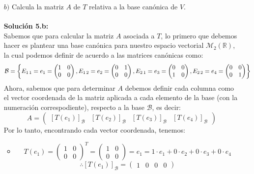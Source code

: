 \begin{itemize}
    \item [$b)$] Calcula la matriz $A$ de $T$ relativa a la base canónica de $V$.\\\\
    \textbf{Soluci\'on 5.b:}\\
    Sabemos que para calcular la matriz $A$ asociada a $T$, lo primero que debemos hacer es plantear una base can\'onica para nuestro espacio vectorial $\mathcal{M}_2(\mathbb{R})$, la cual podemos definir de acuerdo a las matrices can\'onicas como:
    \[\mathcal{B}=\left\{E_{1\hspace{0.5mm}1}=e_1=\begin{pmatrix}
    1 & 0\\
    0 & 0
    \end{pmatrix}, E_{1\hspace{0.5mm}2}=e_2=\begin{pmatrix}
    0 & 1\\
    0 & 0
    \end{pmatrix}, E_{2\hspace{0.5mm}1}=e_3=\begin{pmatrix}
    0 & 0\\
    1 & 0
    \end{pmatrix}, E_{2\hspace{0.5mm}2}=e_4=\begin{pmatrix}
    0 & 0\\
    0 & 1
    \end{pmatrix}\right\}\]
    Ahora, sabemos que para determinar $A$ debemos definir cada columna como el vector coordenada de la matriz aplicada a cada elemento de la base (con la numeraci\'on correspodiente), respecto a la base $\mathcal{B}$, es decir:
    \[A=\begin{pmatrix} [T(e_1)]_{\mathcal{B}} & [T(e_2)]_{\mathcal{B}} &[T(e_3)]_{\mathcal{B}} &[T(e_4)]_{\mathcal{B}} \end{pmatrix}\]
    Por lo tanto, encontrando cada vector coordenada, tenemos:
    \begin{itemize}
        \item \[T(e_1)=\begin{pmatrix}
    1 & 0\\
    0 & 0
    \end{pmatrix}^T=\begin{pmatrix}
    1 & 0\\
    0 & 0
    \end{pmatrix}=e_1=1\cdot e_1+0\cdot e_2+0\cdot e_3+0\cdot e_4\]
    \[\therefore [T(e_1)]_{\mathcal{B}}=\begin{pmatrix} 1 & 0 & 0 & 0\end{pmatrix}\]
    

\end{itemize}
\end{itemize}
